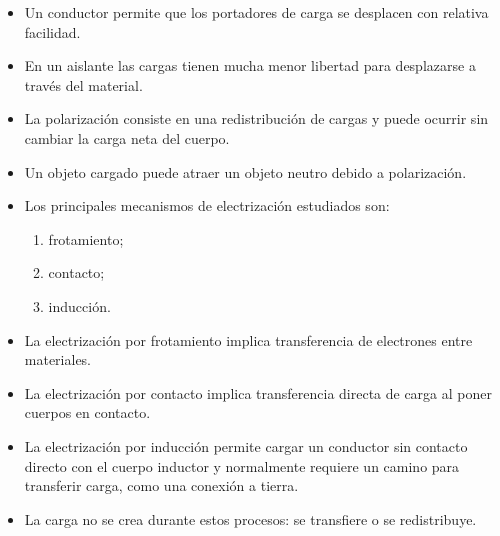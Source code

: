 \begin{resumen}
\begin{itemize}
    \[
    Q=ne.
    \]

    \item Un conductor permite que los portadores de carga se desplacen con
    relativa facilidad.

    \item En un aislante las cargas tienen mucha menor libertad para
    desplazarse a través del material.

    \item La polarización consiste en una redistribución de cargas y puede
    ocurrir sin cambiar la carga neta del cuerpo.

    \item Un objeto cargado puede atraer un objeto neutro debido a
    polarización.

    \item Los principales mecanismos de electrización estudiados son:

    \begin{enumerate}
        \item frotamiento;
        \item contacto;
        \item inducción.
    \end{enumerate}

    \item La electrización por frotamiento implica transferencia de
    electrones entre materiales.

    \item La electrización por contacto implica transferencia directa de
    carga al poner cuerpos en contacto.

    \item La electrización por inducción permite cargar un conductor sin
    contacto directo con el cuerpo inductor y normalmente requiere un camino
    para transferir carga, como una conexión a tierra.

    \item La carga no se crea durante estos procesos: se transfiere o se
    redistribuye.

\end{itemize}

\end{resumen}